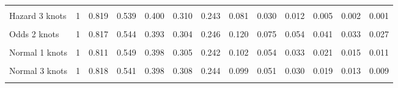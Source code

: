 \documentclass[
]{article}
\begin{document}
\begin{table}[H]
{\begin{tabular}[t]{lrrrrrrrrrrrr}
\cellcolor{gray!10}{Hazard 2 knots} & \cellcolor{gray!10}{1} & \cellcolor{gray!10}{0.817} & \cellcolor{gray!10}{0.545} & \cellcolor{gray!10}{0.396} & \cellcolor{gray!10}{0.305} & \cellcolor{gray!10}{0.243} & \cellcolor{gray!10}{0.096} & \cellcolor{gray!10}{0.043} & \cellcolor{gray!10}{0.021} & \cellcolor{gray!10}{0.010} & \cellcolor{gray!10}{0.005} & \cellcolor{gray!10}{0.003}\\
Hazard 3 knots & 1 & 0.819 & 0.539 & 0.400 & 0.310 & 0.243 & 0.081 & 0.030 & 0.012 & 0.005 & 0.002 & 0.001\\
\cellcolor{gray!10}{Odds 1 knots} & \cellcolor{gray!10}{1} & \cellcolor{gray!10}{0.820} & \cellcolor{gray!10}{0.542} & \cellcolor{gray!10}{0.390} & \cellcolor{gray!10}{0.303} & \cellcolor{gray!10}{0.248} & \cellcolor{gray!10}{0.127} & \cellcolor{gray!10}{0.082} & \cellcolor{gray!10}{0.060} & \cellcolor{gray!10}{0.047} & \cellcolor{gray!10}{0.038} & \cellcolor{gray!10}{0.032}\\
Odds 2 knots & 1 & 0.817 & 0.544 & 0.393 & 0.304 & 0.246 & 0.120 & 0.075 & 0.054 & 0.041 & 0.033 & 0.027\\
\cellcolor{gray!10}{Odds 3 knots} & \cellcolor{gray!10}{1} & \cellcolor{gray!10}{0.818} & \cellcolor{gray!10}{0.542} & \cellcolor{gray!10}{0.398} & \cellcolor{gray!10}{0.308} & \cellcolor{gray!10}{0.246} & \cellcolor{gray!10}{0.110} & \cellcolor{gray!10}{0.066} & \cellcolor{gray!10}{0.045} & \cellcolor{gray!10}{0.033} & \cellcolor{gray!10}{0.026} & \cellcolor{gray!10}{0.021}\\
Normal 1 knots & 1 & 0.811 & 0.549 & 0.398 & 0.305 & 0.242 & 0.102 & 0.054 & 0.033 & 0.021 & 0.015 & 0.011\\
\cellcolor{gray!10}{Normal 2 knots} & \cellcolor{gray!10}{1} & \cellcolor{gray!10}{0.815} & \cellcolor{gray!10}{0.546} & \cellcolor{gray!10}{0.392} & \cellcolor{gray!10}{0.303} & \cellcolor{gray!10}{0.245} & \cellcolor{gray!10}{0.113} & \cellcolor{gray!10}{0.065} & \cellcolor{gray!10}{0.042} & \cellcolor{gray!10}{0.029} & \cellcolor{gray!10}{0.021} & \cellcolor{gray!10}{0.016}\\
Normal 3 knots & 1 & 0.818 & 0.541 & 0.398 & 0.308 & 0.244 & 0.099 & 0.051 & 0.030 & 0.019 & 0.013 & 0.009\\
\cellcolor{gray!10}{Mixture cure Weibull} & \cellcolor{gray!10}{1} & \cellcolor{gray!10}{0.819} & \cellcolor{gray!10}{0.585} & \cellcolor{gray!10}{0.403} & \cellcolor{gray!10}{0.290} & \cellcolor{gray!10}{0.229} & \cellcolor{gray!10}{0.179} & \cellcolor{gray!10}{0.179} & \cellcolor{gray!10}{0.179} & \cellcolor{gray!10}{0.179} & \cellcolor{gray!10}{0.179} & \cellcolor{gray!10}{0.179}\\

\end{tabular}}
\end{table}
\end{document}
